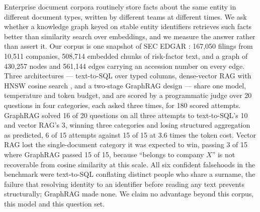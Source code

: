 Enterprise document corpora routinely store facts about the same entity in
different document types, written by different teams at different times. We ask
whether a knowledge graph keyed on stable entity identifiers retrieves such facts
better than similarity search over embeddings, and we measure the answer rather
than assert it. Our corpus is one snapshot of SEC EDGAR \citep{sec2024edgar}:
167{,}050 filings from 10{,}511 companies, 508{,}714 embedded chunks of
risk-factor text, and a graph of 430{,}257 nodes and 561{,}144 edges carrying an
accession number on every edge. Three architectures --- text-to-SQL over typed
columns, dense-vector RAG with HNSW cosine search
\citep{lewis2020rag,malkov2018hnsw}, and a two-stage GraphRAG design --- share one
model, temperature and token budget, and are scored by a programmatic judge over
20 questions in four categories, each asked three times, for 180 scored attempts.
GraphRAG solved 16 of 20 questions on all three attempts to text-to-SQL's 10 and
vector RAG's 3, winning three categories and losing structured aggregation as
predicted, 6 of 15 attempts against 15 of 15 at 3.6 times the token cost. Vector
RAG lost the single-document category it was expected to win, passing 3 of 15
where GraphRAG passed 15 of 15, because ``belongs to company $X$'' is not
recoverable from cosine similarity at this scale. All six confident falsehoods in the benchmark were text-to-SQL conflating distinct people who share a surname, the failure that resolving identity to an identifier before reading any text prevents structurally; GraphRAG made none. We claim no advantage beyond this corpus, this model and this question set.
